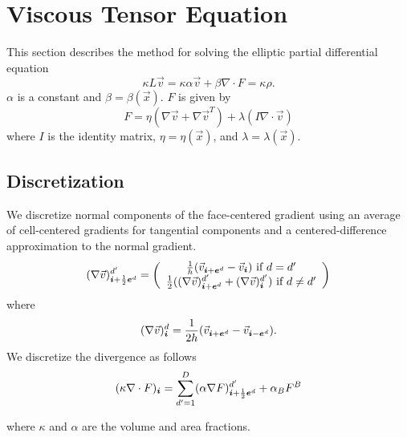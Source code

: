 \newcommand{\vb}{\vec v }
\newcommand{\vx}{\vec x }

\section{Viscous Tensor Equation}
This section describes the method for solving the elliptic partial
differential equation
$$
\kappa L \vb = \kappa \alpha \vb + \beta \nabla \cdot F = \kappa \rho.
$$
$\alpha$ is a constant and $\beta = \beta(\vx)$. $F$ is given by 
\begin{equation}
F = \eta(\nabla \vb + \nabla \vb^T) +  \lambda (I \nabla \cdot \vb)
\label{eqn::visfluxform}
\end{equation}
where $I$ is the identity matrix, $\eta = \eta(\vx)$, and $\lambda =
\lambda(\vx)$.
\subsection{Discretization}

We discretize normal components of the face-centered gradient  using 
an average of cell-centered gradients for tangential components and a
centered-difference approximation to the normal gradient.
$$
(\nabla \vb)^{d'}_{\ibold + \half \ebold^d} = \left( \begin{array}{c}
                      \frac{1}{h}(\vb_{\ibold+ \ebold^d}  -\vb_{\ibold})  \mbox{ if } d = d'\\
                      \frac{1}{2}((\nabla \vb)^{d'}_{\ibold+\ebold^d}  +
                      (\nabla \vb)^{d'}_{\ibold})  \mbox{ if } d \neq d'
                      \end{array}
                      \right)
$$
where 
$$
(\nabla \vb)^{d}_{\ibold} = \frac{1}{2 h}(\vb_{\ibold + \ebold^d} - \vb_{\ibold - \ebold^d}).
$$
We discretize the divergence as follows
$$
(\kappa \nabla \cdot F)_{{\boldsymbol{i}}} = \sum\limits^{D}_{d'=1} 
(\alpha \nabla F)^{d'}_{{\boldsymbol{i}} + \frac{1}{2} {\boldsymbol{e}}^d} + \alpha_B F^B
$$

where $\kappa$ and $\alpha$ are the volume and area fractions.

